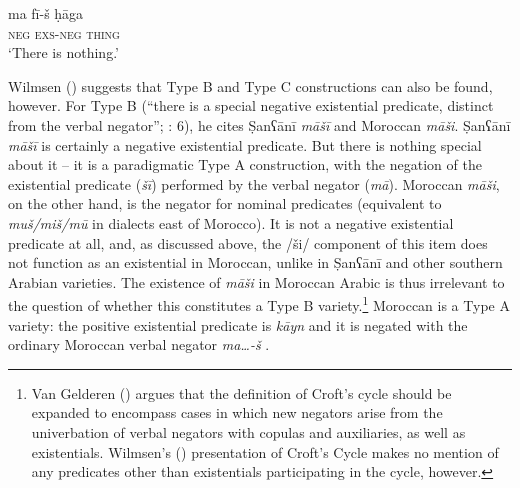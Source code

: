 \documentclass[output=paper]{langsci/langscibook}
\begin{document}
\ex\gll ma fī-š ḥāga\\
     \textsc{neg} \textsc{exs-neg} \textsc{\textup{thing}}\\
\glt  ‘There is nothing.’
\z
\z

Wilmsen (\citeyear[173–175]{Wilmsen2014}) suggests that Type B and Type C constructions can also be found, however. For Type B (“there is a special negative existential predicate, distinct from the verbal negator”; \citealt{Croft1991}: 6), he cites Ṣanʕānī \textit{māšī} and Moroccan \textit{māši}. Ṣanʕānī \textit{māšī} is certainly a negative existential predicate. But there is nothing special about it – it is a paradigmatic Type A construction, with the negation of the existential predicate (\textit{šī}) performed by the verbal negator (\textit{mā}). Moroccan \textit{māši}, on the other hand, is the negator for nominal predicates (equivalent to \textit{muš/miš/mū} in dialects east of Morocco). It is not a negative existential predicate at all, and, as discussed above, the /ši/ component of this item does not function as an existential in Moroccan, unlike in Ṣanʕānī and other southern Arabian varieties. The existence of \textit{m}\-\textit{āši} in Moroccan Arabic is thus irrelevant to the question of whether this constitutes a Type B variety.\footnote{Van Gelderen (\citeyear{VanGelderen2018}) argues that the definition of Croft’s cycle should be expanded to encompass cases in which new negators arise from the univerbation of verbal negators with copulas and auxiliaries, as well as existentials. Wilmsen's (\citeyear{Wilmsen2014}) presentation of Croft’s Cycle makes no mention of any predicates other than existentials participating in the cycle, however.}  Moroccan is a Type A variety: the positive existential predicate is \textit{kāyn} and it is negated with the ordinary Moroccan verbal negator \textit{ma…-š} \citep{Caubet2011}. 
\end{document}

